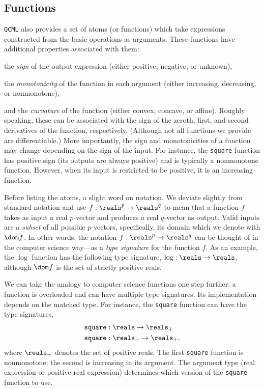 \documentclass[11pt]{article}
\def\qcml{\texttt{QCML}\xspace}
\begin{document}
\subsection{Functions}
\qcml also provides a set of atoms (or functions) which take expressions constructed from the basic operations as arguments. These functions have additional properties associated with them:
\BIT
\item the \emph{sign} of the output expression (either positive, negative, or unknown),
\item the \emph{monotonicity} of the function in each argument (either increasing, decreasing, or nonmonotone),
\item and the \emph{curvature} of the function (either convex, concave, or affine).
\EIT
Roughly speaking, these can be associated with the sign of the zeroth, first, and second derivatives of the function, respectively. (Although not all functions we provide are differentiable.) More importantly, the sign and monotonicities of a function may change depending on the sign of the input. For instance, the {\tt square} function has positive sign (its outputs are always positive) and is typically a nonmonotone function. However, when its input is restricted to be positive, it is an increasing function.

Before listing the atoms, a slight word on notation. We deviate slightly from
standard notation and use $f : \reals^p \to \reals^q$ to mean that a function
$f$ takes as input a real $p$-vector and produces a real $q$-vector as
output. Valid inputs are a \emph{subset} of all possible $p$-vectors,
specifically, its domain which we denote with $\dom f$. In other words, the
notation $f : \reals^p \to \reals^q$ can be thought of in the computer
science way---as a \emph{type signature} for the function $f$. As an example,
the $\log$ function has the following type signature, $\log : \reals \to
\reals$, although $\dom f$ is the set of strictly positive reals.

We can take the analogy to computer science functions one step further: a function is overloaded and can have multiple type signatures. Its implementation depends on the matched type. For instance, the {\tt square} function can have the type signatures,
\begin{align*}
{\tt square} &: \reals \to \reals_+ \\
{\tt square} &: \reals_+ \to \reals_+,
\end{align*}
where $\reals_+$ denotes the set of positive reals. The first {\tt square} function is nonmonotone; the second is increasing in its argument. The argument type (real expression or positive real expression) determines which
version of the {\tt square} function to use.
\end{document}
